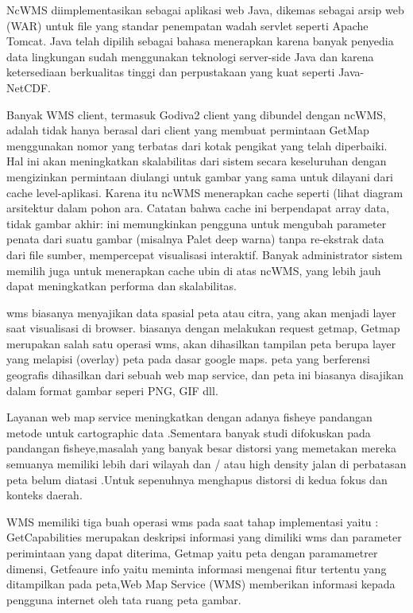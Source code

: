 NcWMS diimplementasikan sebagai aplikasi web Java, dikemas sebagai arsip web (WAR) untuk file yang standar penempatan wadah servlet
seperti Apache Tomcat. Java telah dipilih sebagai bahasa menerapkan karena banyak penyedia data lingkungan sudah menggunakan teknologi
server-side Java dan karena ketersediaan berkualitas tinggi dan perpustakaan yang kuat seperti Java-NetCDF.

Banyak WMS client, termasuk Godiva2 client yang dibundel dengan ncWMS, adalah tidak hanya berasal dari client yang membuat permintaan
GetMap menggunakan nomor yang terbatas dari kotak pengikat yang telah diperbaiki. Hal ini akan meningkatkan skalabilitas dari sistem
secara keseluruhan dengan mengizinkan permintaan diulangi untuk gambar yang sama untuk dilayani dari cache level-aplikasi. Karena itu
ncWMS menerapkan cache seperti (lihat diagram arsitektur dalam pohon ara.  Catatan bahwa cache ini berpendapat array data, tidak gambar
akhir: ini memungkinkan pengguna untuk mengubah parameter penata dari suatu gambar (misalnya Palet deep warna) tanpa re-ekstrak data
dari file sumber, mempercepat visualisasi interaktif. Banyak administrator sistem memilih juga untuk menerapkan cache ubin di atas
ncWMS, yang lebih jauh dapat meningkatkan performa dan skalabilitas.

wms biasanya menyajikan data spasial peta atau citra, yang akan menjadi layer saat visualisasi di browser.
biasanya dengan melakukan request getmap, Getmap merupakan salah satu operasi wms, akan dihasilkan tampilan peta berupa layer yang
melapisi (overlay) peta pada dasar google maps. peta yang berferensi geografis dihasilkan dari sebuah web map service, dan peta ini
biasanya disajikan dalam format gambar seperi PNG, GIF dll.

Layanan web map service  meningkatkan dengan  adanya fisheye pandangan metode untuk cartographic data .Sementara banyak studi difokuskan
pada pandangan fisheye,masalah yang banyak besar distorsi yang memetakan mereka semuanya memiliki lebih dari wilayah dan / atau high
density jalan di perbatasan peta belum diatasi .Untuk sepenuhnya menghapus distorsi di kedua fokus dan konteks daerah.

WMS memiliki tiga buah operasi wms pada saat tahap implementasi yaitu : GetCapabilities merupakan deskripsi informasi yang dimiliki wms
dan parameter perimintaan yang dapat diterima, Getmap yaitu peta dengan paramametrer dimensi, Getfeaure info yaitu meminta informasi 
mengenai fitur tertentu yang ditampilkan pada peta,Web Map Service (WMS) memberikan informasi kepada pengguna internet oleh tata ruang peta gambar.

